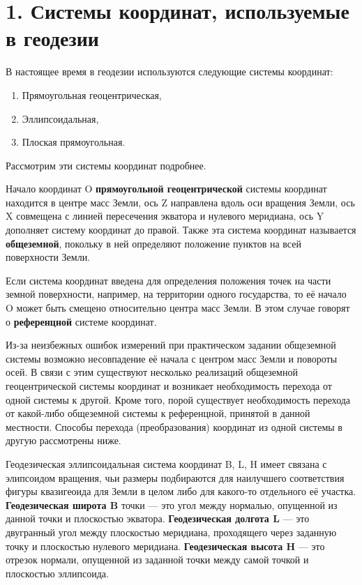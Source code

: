 \documentclass[12pt]{report}
\begin{document}
\chapter*{1. Системы координат, используемые в геодезии}
В настоящее время в геодезии используются следующие системы координат:
\begin{enumerate}
\item Прямоугольная геоцентрическая,
\item Эллипсоидальная,
\item Плоская прямоугольная.
\end{enumerate}
Рассмотрим эти системы координат подробнее.
\par
Начало координат O \textbf{прямоугольной геоцентрической} системы координат находится в центре масс Земли, ось Z направлена вдоль оси вращения Земли, ось X совмещена с линией пересечения экватора и нулевого меридиана, ось Y дополняет систему координат до правой. Также эта система координат называется \textbf{общеземной}, покольку в ней определяют положение пунктов на всей поверхности Земли.
\par
Если система координат введена для определения положения точек на части земной поверхности, например, на территории одного государства, то её начало O может быть смещено относительно центра масс Земли. В этом случае говорят о \textbf{референцной} системе координат.
\par
Из-за неизбежных ошибок измерений при практическом задании общеземной системы возможно несовпадение её начала с центром масс Земли и повороты осей. В связи с этим существуют несколько реализаций общеземной геоцентрической системы координат и возникает необходимость перехода от одной системы к другой. Кроме того, порой существует необходимость перехода от какой-либо общеземной системы к референцной, принятой в данной местности. Способы перехода (преобразования) координат из одной системы в другую рассмотрены ниже.
\par
Геодезическая эллипсоидальная система координат B, L, H имеет связана с элипсоидом вращения, чьи размеры подбираются для наилучшего соответствия фигуры квазигеоида для Земли в целом либо для какого-то отдельного её участка. \textbf{Геодезическая широта B} точки --- это угол между нормалью, опущенной из данной точки и плоскостью экватора. \textbf{Геодезическая долгота L} --- это двугранный угол между плоскостью меридиана, проходящего через заданную точку и плоскостью нулевого меридиана. \textbf{Геодезическая высота H} --- это отрезок нормали, опущенной из заданной точки между самой точкой и плоскостью эллипсоида.
\end{document}
